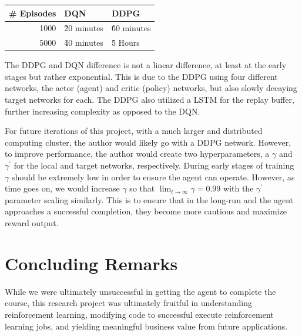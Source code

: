 \documentclass[doc, onecolumn, 12pt]{apa6}
\begin{document}
\begin{tabular}{r||ll}
\hline 
\# Episodes & DQN & DDPG \\ 
\hline 
1000 &  \~ 20 minutes &  \~ 60 minutes \\ 
5000 & \~ 40 minutes & \~ 5 Hours \\ 
\hline
\end{tabular} 


The DDPG and DQN difference is not a linear difference, at least at the early stages but rather exponential. This is due to the DDPG using four different networks, the actor (agent) and critic (policy) networks, but also slowly decaying target networks for each. The DDPG also utilized a LSTM for the replay buffer, further increasing complexity as opposed to the DQN. 

For future iterations of this project, with a much larger and distributed computing cluster, the author would likely go with a DDPG network. However, to improve performance, the author would create two hyperparameters, a $\gamma$ and $\gamma^{\prime}$ for the local and target networks, respectively. During early stages of training $\gamma$ should be extremely low in order to  ensure the agent can operate. However, as time goes on, we would increase $\gamma$ so that $\lim_{t \to \infty} \gamma = 0.99$ with the $\gamma^{\prime}$ parameter scaling similarly. This is to ensure that in the long-run and the agent approaches a successful completion, they become more cautious and maximize reward output. 




\newpage 
\section{Concluding Remarks}

While we were ultimately unsuccessful  in getting the agent to complete the course, this research project was ultimately fruitful in understanding reinforcement learning, modifying code to successful execute reinforcement learning jobs, and yielding meaningful business value from future applications. 
\end{document}
